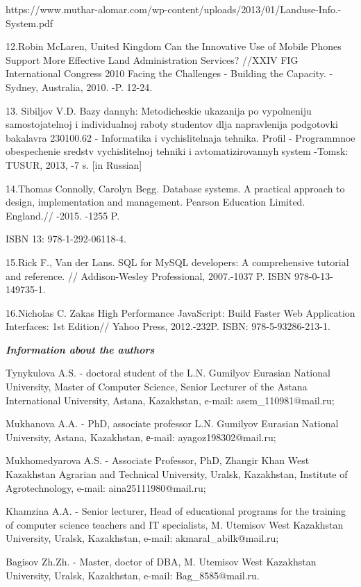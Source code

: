 \begin{noparindent}
https://www.muthar-alomar.com/wp-content/uploads/2013/01/Landuse-Info.-System.pdf

12.Robin McLaren, United Kingdom Can the Innovative Use of Mobile Phones
Support More Effective Land Administration Services? //XXIV FIG
International Congress 2010 Facing the Challenges - Building the
Capacity. - Sydney, Australia, 2010. -P. 12-24.

13. Sibiljov V.D. Bazy dannyh: Metodicheskie ukazanija po vypolneniju
samostojatel\textquotesingle noj i individual\textquotesingle noj raboty
studentov dlja napravlenija podgotovki bakalavra 230100.62 - Informatika
i vychislitel\textquotesingle naja tehnika. Profil\textquotesingle{} -
Programmnoe obespechenie sredstv vychislitel\textquotesingle noj tehniki
i avtomatizirovannyh system -Tomsk: TUSUR, 2013, -7 s. {[}in Russian{]}

14.Thomas Connolly, Carolyn Begg. Database systems. A practical approach
to design, implementation and management. Pearson Education Limited.
England.// -2015. -1255 P.

ISBN 13: 978-1-292-06118-4.

15.Rick F., Van der Lans. SQL for MySQL developers: A comprehensive
tutorial and reference. // Addison-Wesley Professional, 2007.-1037 P.
ISBN 978-0-13-149735-1.

16.Nicholas C. Zakas High Performance JavaScript: Build Faster Web
Application Interfaces: 1st Edition// Yahoo Press, 2012.-232P. ISBN:
978-5-93286-213-1.
\end{noparindent}

\emph{{\bfseries Information about the authors}}

\begin{noparindent}
Tynykulova A.S. - doctoral student of the L.N. Gumilyov Eurasian
National University, Master of Computer Science, Senior Lecturer of the
Astana International University, Astana, Kazakhstan, e-mail:
asem\_110981@mail.ru;

Mukhanova A.A. - PhD, associate professor L.N. Gumilyov Eurasian
National University, Astana, Kazakhstan, е-mail: ayagoz198302@mail.ru;

Mukhomedyarova A.S. - Associate Professor, PhD, Zhangir Khan West
Kazakhstan Agrarian and Technical University, Uralsk, Kazakhstan,
Institute of Agrotechnology, e-mail: aina25111980@mail.ru;

Khamzina A.A. - Senior lecturer, Head of educational programs for the
training of computer science teachers and IT specialists, M. Utemisov
West Kazakhstan University, Uralsk, Kazakhstan, e-mail:
akmaral\_abilk@mail.ru;

Bagisov Zh.Zh. - Master, doctor of DBA, M. Utemisov West Kazakhstan
University, Uralsk, Kazakhstan, e-mail: Bag\_8585@mail.ru.
\end{noparindent}

